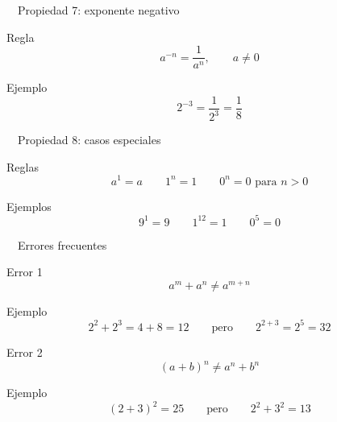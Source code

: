 \documentclass[aspectratio=169,10pt,handout]{beamer}
\newcommand{\pp}{\pause}
\newcommand{\iconoDesarrollo}{\faBrain}
\newcommand{\iconoError}{\faExclamationTriangle}
\begin{document}
	\begin{frame}{\iconoDesarrollo\ \ Propiedad 7: exponente negativo}
		\begin{block}{Regla}
			\[
			a^{-n}=\frac{1}{a^n},\qquad a\neq0
			\]
		\end{block}
		
		\begin{exampleblock}{Ejemplo}
			\[
			2^{-3}=\frac{1}{2^3}=\frac{1}{8}
			\]
		\end{exampleblock}
	\end{frame}
	
	\begin{frame}{\iconoDesarrollo\ \ Propiedad 8: casos especiales}
		\begin{block}{Reglas}
			\[
			a^1=a
			\qquad
			1^n=1
			\qquad
			0^n=0 \text{ para } n>0
			\]
		\end{block}
		
		\begin{exampleblock}{Ejemplos}
			\[
			9^1=9
			\qquad
			1^{12}=1
			\qquad
			0^5=0
			\]
		\end{exampleblock}
	\end{frame}
	
	\begin{frame}{\iconoError\ \ Errores frecuentes}
		\begin{alertblock}{Error 1}
			\[
			a^m+a^n \neq a^{m+n}
			\]
		\end{alertblock}
		
		\begin{exampleblock}{Ejemplo}
			\[
			2^2+2^3=4+8=12
			\qquad \text{pero} \qquad
			2^{2+3}=2^5=32
			\]
		\end{exampleblock}
		
		\pp
		
		\begin{alertblock}{Error 2}
			\[
			(a+b)^n \neq a^n+b^n
			\]
		\end{alertblock}
		
		\begin{exampleblock}{Ejemplo}
			\[
			(2+3)^2=25
			\qquad \text{pero} \qquad
			2^2+3^2=13
			\]
		\end{exampleblock}
	\end{frame}
	
\end{document}
